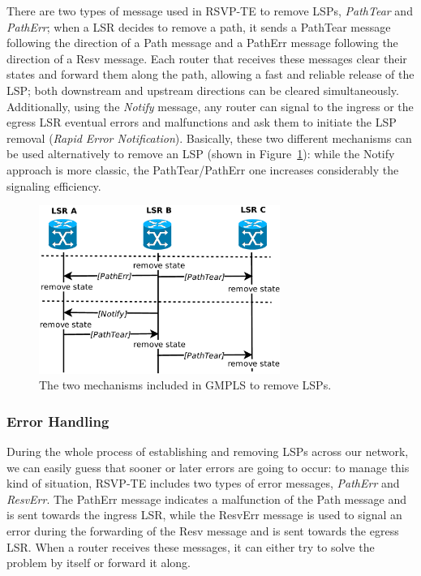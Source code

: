 \documentclass[10pt,a4paper]{report}
\begin{document}
There are two types of message used in RSVP-TE to remove LSPs,
\textit{PathTear} and \textit{PathErr}; when a LSR decides to remove a
path, it sends a PathTear message following the direction of a Path
message and a PathErr message following the direction of a Resv
message. Each router that receives these messages clear their states
and forward them along the path, allowing a fast and reliable release
of the LSP; both downstream and upstream directions can be cleared
simultaneously. Additionally, using the \textit{Notify} message, any
router can signal to the ingress or the egress LSR eventual errors and
malfunctions and ask them to initiate the LSP removal (\textit{Rapid
  Error Notification}). Basically, these two different mechanisms can
be used alternatively to remove an LSP (shown in
Figure~\ref{fig:rsvp_tear}): while the Notify approach is more
classic, the PathTear/PathErr one increases considerably the signaling
efficiency.

\begin{figure}[!htbp]
  \centering
  \includegraphics[width=0.7\textwidth]{img/rsvp_tear}
  \caption[RSVP-TE path removal]{The two mechanisms included in GMPLS
    to remove LSPs.}
  \label{fig:rsvp_tear}
\end{figure}

\subsubsection{Error Handling}

During the whole process of establishing and removing LSPs across our
network, we can easily guess that sooner or later errors are going to
occur: to manage this kind of situation, RSVP-TE includes two types of
error messages, \textit{PathErr} and \textit{ResvErr}. The PathErr
message indicates a malfunction of the Path message and is sent
towards the ingress LSR, while the ResvErr message is used to signal
an error during the forwarding of the Resv message and is sent towards
the egress LSR\@. When a router receives these messages, it can either
try to solve the problem by itself or forward it along.
\end{document}
